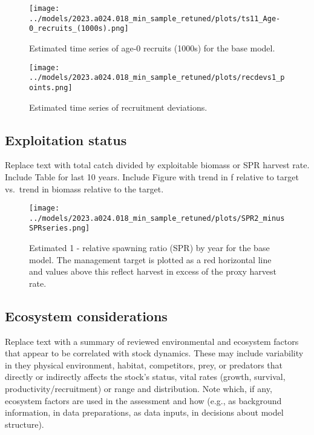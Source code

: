 \documentclass[11pt,
  english,
  letterpaper,
]{article}
\begin{document}
\begin{figure}
\centering
\texttt{[image: ../models/2023.a024.018\_min\_sample\_retuned/plots/ts11\_Age-0\_recruits\_(1000s).png]}
\caption{Estimated time series of age-0 recruits (1000s) for the base model.\label{fig:es-recruits}}
\end{figure}

\begin{figure}
\centering
\texttt{[image: ../models/2023.a024.018\_min\_sample\_retuned/plots/recdevs1\_points.png]}
\caption{Estimated time series of recruitment deviations.\label{fig:es-rec-devs}}
\end{figure}

\clearpage

\hypertarget{exploitation-status}{%
\subsection*{Exploitation status}\label{exploitation-status}}

Replace text with total catch divided by exploitable biomass or SPR harvest rate. Include Table for last 10 years. Include Figure with trend in f relative to target vs.~trend in biomass relative to the target.



\begin{figure}
\centering
\texttt{[image: ../models/2023.a024.018\_min\_sample\_retuned/plots/SPR2\_minusSPRseries.png]}
\caption{Estimated 1 - relative spawning ratio (SPR) by year for the base model. The management target is plotted as a red horizontal line and values above this reflect harvest in excess of the proxy harvest rate.\label{fig:es-1-spr}}
\end{figure}

\clearpage

\hypertarget{ecosystem-considerations}{%
\subsection*{Ecosystem considerations}\label{ecosystem-considerations}}

Replace text with a summary of reviewed environmental and ecosystem factors that appear to be correlated with stock dynamics. These may include variability in they physical environment, habitat, competitors, prey, or predators that directly or indirectly affects the stock's status, vital rates (growth, survival, productivity/recruitment) or range and distribution. Note which, if any, ecosystem factors are used in the assessment and how (e.g., as background information, in data preparations, as data inputs, in decisions about model structure).
\end{document}
